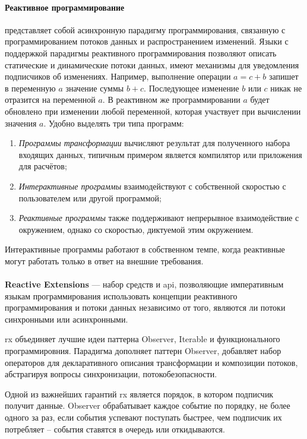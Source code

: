 \paragraph{Реактивное программирование}
представляет собой асинхронную парадигму программирования, связанную с программированием потоков данных и распространением изменений. Языки с поддержкой парадигмы реактивного программирования позволяют описать статические и динамические потоки данных, имеют механизмы для уведомления подписчиков об изменениях. Например, выполнение операции \(a = c + b\) запишет в переменную \(a\) значение суммы \(b + c\). Последующее изменение \(b\) или \(c\) никак не отразится на переменной \(a\). В реактивном же программировании \(a\) будет обновлено при изменении любой переменной, которая участвует при вычислении значения \(a\).
Удобно выделять три типа программ:
\begin{enumerate}
	\item \textit{Программы трансформации} вычисляют результат для полученного набора входящих данных, типичным примером является компилятор или приложения для расчётов;
	\item \textit{Интерактивные программы} взаимодействуют с собственной скоростью с пользователем или другой программой;
	\item \textit{Реактивные программы} также поддерживают непрерывное взаимодействие с окружением, однако со скоростью, диктуемой этим окружением.
\end{enumerate}
Интерактивные программы работают в собственном темпе, когда реактивные могут работать только в ответ на внешние требования.

\paragraph{}
\textbf{Reactive Extensions} --- набор средств и \gls{api}, позволяющие императивным языкам программирования использовать концепции реактивного программирования и потоки данных независимо от того, являются ли потоки синхронными или асинхронными. \cite{wiki:rx}

\gls{rx} объединяет лучшие идеи паттерна Observer, Iterable и функционального программировния. Парадигма дополняет паттерн Observer, добавляет набор операторов для декларативного описания трансформации и композиции потоков, абстрагируя вопросы синхронизации, потокобезопасности.

Одной из важнейших гарантий \gls{rx} является порядок, в котором подписчик получит данные. Observer обрабатывает каждое событие по порядку, не более одного за раз, если события успевают поступать быстрее, чем подписчик их потребляет -- события ставятся в очередь или откидываются.

